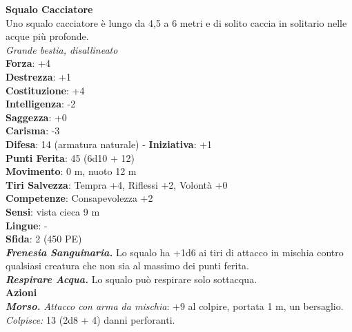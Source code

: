 \begin{multicols}{2}
\medskip\textbf{Squalo Cacciatore}\\
Uno squalo cacciatore è lungo da 4,5 a 6 metri e di solito caccia in solitario nelle acque più profonde.\\
\emph{Grande bestia, disallineato}\\
\textbf{Forza}: +4\\
\textbf{Destrezza}: +1\\
\textbf{Costituzione}: +4\\
\textbf{Intelligenza}: -2\\
\textbf{Saggezza}: +0\\
\textbf{Carisma}: -3\\
\textbf{Difesa}: 14 (armatura naturale) - \textbf{Iniziativa}: +1\\
\textbf{Punti Ferita}: 45 (6d10 + 12)\\
\textbf{Movimento}: 0 m, nuoto 12 m\\
\textbf{Tiri Salvezza}: Tempra +4, Riflessi +2, Volontà +0\\
\textbf{Competenze}: Consapevolezza +2\\
\textbf{Sensi}: vista cieca 9 m\\
\textbf{Lingue}: -\\
\textbf{Sfida}: 2 (450 PE)\smallskip\\
\emph{\textbf{Frenesia Sanguinaria.}} Lo squalo ha +1d6 ai tiri di attacco in mischia contro qualsiasi creatura che non sia al massimo dei punti ferita.\\
\emph{\textbf{Respirare Acqua.}} Lo squalo può respirare solo sottacqua.\\
\smallskip\textbf{Azioni}\\
\emph{\textbf{Morso.} Attacco con arma da mischia}: +9 al colpire, portata 1 m, un bersaglio.\\
\emph{Colpisce:} 13 (2d8 + 4) danni perforanti.\\


\end{multicols}
